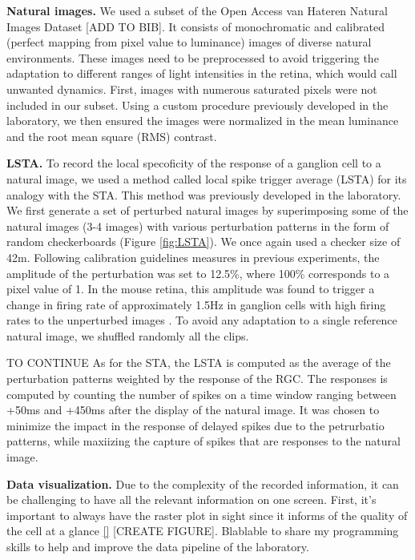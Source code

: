 
\textbf{Natural images.}
We used a subset of the Open Access van Hateren Natural Images Dataset [ADD TO
        BIB]. It consists of monochromatic and calibrated (perfect mapping from
pixel
value to luminance) images of diverse natural environments. These images need
to
be preprocessed to avoid triggering the adaptation to different ranges of light
intensities in the retina, which would call unwanted
dynamics. First, images with numerous saturated pixels were not included in our
subset. Using a custom procedure previously developed in the laboratory, we
then
ensured the images were normalized in the mean luminance and the root mean
square (RMS) contrast.

\textbf{LSTA.}
To record the local specoficity of the response of a ganglion cell to a natural
image, we used a method called local spike trigger average (LSTA) for its
analogy with the STA. This method was previously developed in the laboratory.
We first generate a set of perturbed natural images by superimposing some of
the natural images (3-4 images) with various perturbation patterns in the form
of random checkerboards (Figure \ref{fig:LSTA}). We once again used a checker
size of 42\textmu m.
Following calibration guidelines measures in previous experiments, the
amplitude of the perturbation was set to 12.5\%, where 100\% corresponds to a
pixel value of 1. In the mouse retina, this amplitude was found to trigger a
change in firing rate of approximately 1.5Hz in ganglion cells with high firing
rates to the unperturbed images \citep{goldin_context-dependent_2022}. To avoid any adaptation to a single reference natural image, we shuffled randomly all the clips.

TO CONTINUE
As for the STA, the LSTA is computed as the average of the perturbation patterns weighted by the response of the RGC. The responses is computed by counting the number of spikes on a time window ranging between +50ms and +450ms after the display of the natural image. It was chosen to minimize the impact in the response of delayed spikes due to the petrurbatio patterns, while maxiizing the capture of spikes that are responses to the natural image.

\textbf{Data visualization.}
Due to the complexity of the recorded information, it can be challenging to
have
all the relevant information on one screen. First, it's important to always
have the raster plot in sight since it informs of the quality of the cell at a
glance \ref{} [CREATE FIGURE].
Blablable to share my programming skills to help and improve the data pipeline
of the laboratory.

